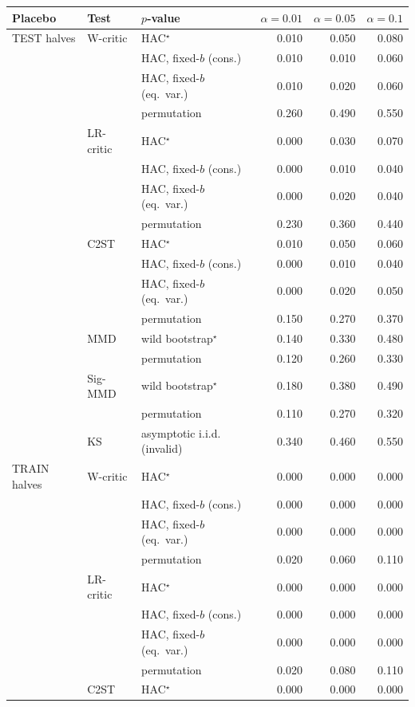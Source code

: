 \begin{tabular}{lllrrr}
\toprule
Placebo & Test & $p$-value & $\alpha=0.01$ & $\alpha=0.05$ & $\alpha=0.1$ \\
\midrule
TEST halves & W-critic & HAC$^{\star}$ & 0.010 & 0.050 & 0.080 \\
 &  & HAC, fixed-$b$ (cons.) & 0.010 & 0.010 & 0.060 \\
 &  & HAC, fixed-$b$ (eq.\ var.) & 0.010 & 0.020 & 0.060 \\
 &  & permutation & 0.260 & 0.490 & 0.550 \\
 & LR-critic & HAC$^{\star}$ & 0.000 & 0.030 & 0.070 \\
 &  & HAC, fixed-$b$ (cons.) & 0.000 & 0.010 & 0.040 \\
 &  & HAC, fixed-$b$ (eq.\ var.) & 0.000 & 0.020 & 0.040 \\
 &  & permutation & 0.230 & 0.360 & 0.440 \\
 & C2ST & HAC$^{\star}$ & 0.010 & 0.050 & 0.060 \\
 &  & HAC, fixed-$b$ (cons.) & 0.000 & 0.010 & 0.040 \\
 &  & HAC, fixed-$b$ (eq.\ var.) & 0.000 & 0.020 & 0.050 \\
 &  & permutation & 0.150 & 0.270 & 0.370 \\
 & MMD & wild bootstrap$^{\star}$ & 0.140 & 0.330 & 0.480 \\
 &  & permutation & 0.120 & 0.260 & 0.330 \\
 & Sig-MMD & wild bootstrap$^{\star}$ & 0.180 & 0.380 & 0.490 \\
 &  & permutation & 0.110 & 0.270 & 0.320 \\
 & KS & asymptotic i.i.d. (invalid) & 0.340 & 0.460 & 0.550 \\
TRAIN halves & W-critic & HAC$^{\star}$ & 0.000 & 0.000 & 0.000 \\
 &  & HAC, fixed-$b$ (cons.) & 0.000 & 0.000 & 0.000 \\
 &  & HAC, fixed-$b$ (eq.\ var.) & 0.000 & 0.000 & 0.000 \\
 &  & permutation & 0.020 & 0.060 & 0.110 \\
 & LR-critic & HAC$^{\star}$ & 0.000 & 0.000 & 0.000 \\
 &  & HAC, fixed-$b$ (cons.) & 0.000 & 0.000 & 0.000 \\
 &  & HAC, fixed-$b$ (eq.\ var.) & 0.000 & 0.000 & 0.000 \\
 &  & permutation & 0.020 & 0.080 & 0.110 \\
 & C2ST & HAC$^{\star}$ & 0.000 & 0.000 & 0.000 \\

\end{tabular}
